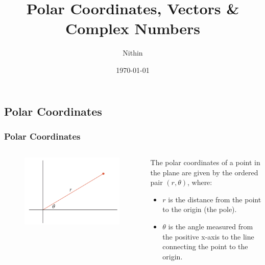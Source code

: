 \documentclass{beamer}
\title{Polar Coordinates, Vectors \& Complex Numbers}
\author{Nithin}
\institute{}
\date{\today}
\begin{document}
\begin{frame}
  \titlepage
\end{frame}
\begin{frame}
  \tableofcontents
\end{frame}
\subsection{Polar Coordinates} 
\begin{frame}
\frametitle{Polar Coordinates}
\begin{columns}
        \begin{figure}
        \centering
        \includegraphics[width=\textwidth]{polar1.png}
        \end{figure}
    \begin{definition}
        The polar coordinates of a point in the plane are given by the ordered pair \((r, \theta)\), where:
        \begin{itemize}
            \item \(r\) is the distance from the point to the origin (the pole).
            \item \(\theta\) is the angle measured from the positive x-axis to the line connecting the point to the origin.
        \end{itemize}
    \end{definition}
\end{columns}
\end{frame}
\end{document}
